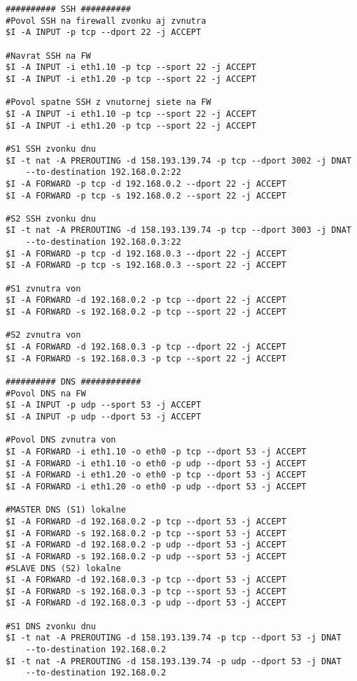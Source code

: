 {\begin{small}
\begin{verbatim}
########## SSH ##########
#Povol SSH na firewall zvonku aj zvnutra
$I -A INPUT -p tcp --dport 22 -j ACCEPT

#Navrat SSH na FW
$I -A INPUT -i eth1.10 -p tcp --sport 22 -j ACCEPT
$I -A INPUT -i eth1.20 -p tcp --sport 22 -j ACCEPT

#Povol spatne SSH z vnutornej siete na FW
$I -A INPUT -i eth1.10 -p tcp --sport 22 -j ACCEPT
$I -A INPUT -i eth1.20 -p tcp --sport 22 -j ACCEPT

#S1 SSH zvonku dnu
$I -t nat -A PREROUTING -d 158.193.139.74 -p tcp --dport 3002 -j DNAT 
	--to-destination 192.168.0.2:22
$I -A FORWARD -p tcp -d 192.168.0.2 --dport 22 -j ACCEPT
$I -A FORWARD -p tcp -s 192.168.0.2 --sport 22 -j ACCEPT

#S2 SSH zvonku dnu
$I -t nat -A PREROUTING -d 158.193.139.74 -p tcp --dport 3003 -j DNAT 
	--to-destination 192.168.0.3:22
$I -A FORWARD -p tcp -d 192.168.0.3 --dport 22 -j ACCEPT
$I -A FORWARD -p tcp -s 192.168.0.3 --sport 22 -j ACCEPT

#S1 zvnutra von
$I -A FORWARD -d 192.168.0.2 -p tcp --dport 22 -j ACCEPT
$I -A FORWARD -s 192.168.0.2 -p tcp --sport 22 -j ACCEPT

#S2 zvnutra von
$I -A FORWARD -d 192.168.0.3 -p tcp --dport 22 -j ACCEPT
$I -A FORWARD -s 192.168.0.3 -p tcp --sport 22 -j ACCEPT

########## DNS ############
#Povol DNS na FW
$I -A INPUT -p udp --sport 53 -j ACCEPT
$I -A INPUT -p udp --dport 53 -j ACCEPT

#Povol DNS zvnutra von
$I -A FORWARD -i eth1.10 -o eth0 -p tcp --dport 53 -j ACCEPT
$I -A FORWARD -i eth1.10 -o eth0 -p udp --dport 53 -j ACCEPT
$I -A FORWARD -i eth1.20 -o eth0 -p tcp --dport 53 -j ACCEPT
$I -A FORWARD -i eth1.20 -o eth0 -p udp --dport 53 -j ACCEPT

#MASTER DNS (S1) lokalne
$I -A FORWARD -d 192.168.0.2 -p tcp --dport 53 -j ACCEPT
$I -A FORWARD -s 192.168.0.2 -p tcp --sport 53 -j ACCEPT
$I -A FORWARD -d 192.168.0.2 -p udp --dport 53 -j ACCEPT
$I -A FORWARD -s 192.168.0.2 -p udp --sport 53 -j ACCEPT
#SLAVE DNS (S2) lokalne
$I -A FORWARD -d 192.168.0.3 -p tcp --dport 53 -j ACCEPT
$I -A FORWARD -s 192.168.0.3 -p tcp --sport 53 -j ACCEPT
$I -A FORWARD -d 192.168.0.3 -p udp --dport 53 -j ACCEPT

#S1 DNS zvonku dnu
$I -t nat -A PREROUTING -d 158.193.139.74 -p tcp --dport 53 -j DNAT 
	--to-destination 192.168.0.2
$I -t nat -A PREROUTING -d 158.193.139.74 -p udp --dport 53 -j DNAT 
	--to-destination 192.168.0.2


\end{verbatim}
\end{small}}
